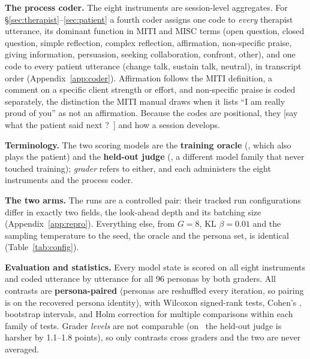 \textbf{The process coder.} The eight instruments are session-level aggregates. For
\S\ref{sec:therapist}--\ref{sec:patient} a fourth coder assigns one code to \emph{every}
therapist utterance, its dominant function in MITI and MISC terms (open question, closed
question, simple reflection, complex reflection, affirmation, non-specific praise, giving
information, persuasion, seeking collaboration, confront, other), and one code to every patient
utterance (change talk, sustain talk, neutral), in transcript order (Appendix~\ref{app:coder}).
Affirmation follows the MITI definition, a comment on a specific client strength or effort, and
non-specific praise is coded separately, the distinction the MITI manual draws when it lists ``I
am really proud of you'' as not an affirmation. Because the codes are positional, they [say what
the patient said next ?~] and how a session develops.

\textbf{Terminology.} The two scoring models are the \textbf{training oracle} (\primaryjudge,
which also plays the patient) and the \textbf{held-out judge} (\heldoutjudge, a different model
family that never touched training); \emph{grader} refers to either, and each administers the
eight instruments and the process coder.

\textbf{The two arms.} The runs are a controlled pair: their tracked run configurations differ in
exactly two fields, the look-ahead depth and its batching size (Appendix~\ref{app:repro}).
Everything else, from $G{=}8$, KL $\beta{=}0.01$ and the sampling temperature to the seed, the
oracle and the persona set, is identical (Table~\ref{tab:config}).

\textbf{Evaluation and statistics.} Every model state is scored on all eight instruments and
coded utterance by utterance for all 96 personas by both graders. All contrasts are
\textbf{persona-paired} (personas are reshuffled every iteration, so pairing is on the recovered
persona identity), with Wilcoxon signed-rank tests, Cohen's \dz, bootstrap intervals, and Holm
correction for multiple comparisons within each family of tests. Grader \emph{levels} are not comparable (on \QQ\ the
held-out judge is harsher by 1.1--1.8 points), so only contrasts cross graders and the two are
never averaged.
